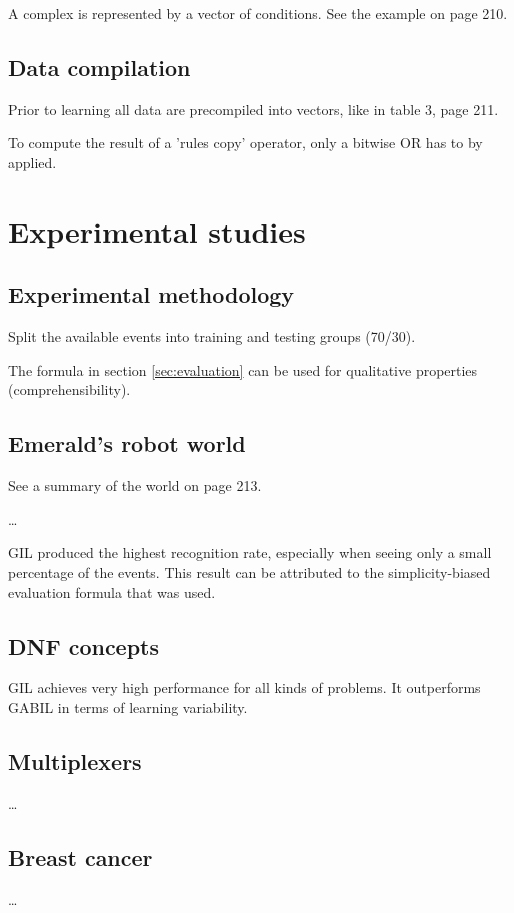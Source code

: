 \documentclass[12pt]{book}
\newcounter{subsubsubsection}[subsubsection]
\begin{document}
A complex is represented by a vector of conditions. See the example on page 210.

\subsection{Data compilation}
Prior to learning all data are precompiled into vectors, like in table 3, page 211.

To compute the result of a 'rules copy' operator, only a bitwise OR has to by applied.

\section{Experimental studies}
\subsection{Experimental methodology}
Split the available events into training and testing groups (70/30).

The formula in section \ref{sec:evaluation} can be used for qualitative properties (comprehensibility).

\subsection{Emerald's robot world}
See a summary of the world on page 213.

\dots

GIL produced the highest recognition rate, especially when seeing only a small percentage of the events. This result can be attributed to the simplicity-biased evaluation formula that was used.

\subsection{DNF concepts}
GIL achieves very high performance for all kinds of problems. It outperforms GABIL in terms of learning variability.

\subsection{Multiplexers}
\dots

\subsection{Breast cancer}
\dots
\end{document}
